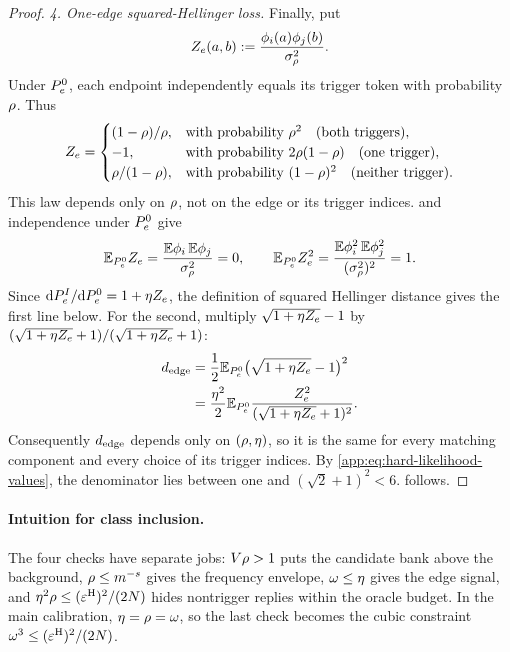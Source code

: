 \begin{proof}
\emph{4. One-edge squared-Hellinger loss.}
Finally, put
\[
 Z_e(a,b):=
 \frac{\phi_{i}(a)\phi_{j}(b)}
      {\sigma_\rho^2}.
\]
Under \(P_{e}^{0}\), each endpoint independently equals
its trigger token with probability \(\rho\).  Thus
\[
 Z_e=
 \begin{cases}
 (1-\rho)/\rho,
   &\text{with probability }\rho^2
      \quad\text{(both triggers)},\\
 -1,
   &\text{with probability }2\rho(1-\rho)
      \quad\text{(one trigger)},\\
 \rho/(1-\rho),
   &\text{with probability }(1-\rho)^2
      \quad\text{(neither trigger)}.
 \end{cases}
 \]
This law depends only on \(\rho\), not on the edge or its trigger
indices.
 and independence under
\(P_{e}^{0}\) give
\[
 \mathbb E_{P_{e}^{0}}Z_e
 =\frac{\mathbb E\phi_{i}\,
        \mathbb E\phi_{j}}{\sigma_\rho^2}=0,\qquad
 \mathbb E_{P_{e}^{0}}Z_e^2
 =\frac{\mathbb E\phi_{i}^2\,
        \mathbb E\phi_{j}^2}{(\sigma_\rho^2)^2}=1.
\]  Since
\(\mathrm dP_{e}^{I}/\mathrm dP_{e}^{0}
=1+\eta Z_e\),
the definition of squared Hellinger distance gives the first line below.
For the second, multiply
$\sqrt{1+\eta Z_e}-1$ by
$(\sqrt{1+\eta Z_e}+1)/
 (\sqrt{1+\eta Z_e}+1)$:
\begin{align}
 d_{\mathrm{edge}}
 &=\frac12\mathbb E_{P_{e}^{0}}
       \bigl(\sqrt{1+\eta Z_e}-1\bigr)^2\notag\\
 &=\frac{\eta^2}{2}
  \mathbb E_{P_{e}^{0}}
  \frac{Z_e^2}
       {(\sqrt{1+\eta Z_e}+1)^2}.
 \label{app:eq:hard-edge-distance-formula}
\end{align}
Consequently \(d_{\mathrm{edge}}\) depends only on
\((\rho,\eta)\), so it is the same for every matching
component and every choice of its trigger indices.
By \eqref{app:eq:hard-likelihood-values}, the denominator lies between
one and \((\sqrt2+1)^2<6\).
 follows.
\end{proof}

\paragraph{Intuition for class inclusion.}
The four checks have separate jobs:
$V\rho>1$ puts the candidate bank above the background,
$\rho\le m^{-s}$ gives the frequency
envelope, $\omega\le\eta$ gives the edge signal, and
$\eta^2\rho\le(\varepsilon^{\mathrm H})^2/(2N)$ hides nontrigger replies
within the oracle budget.  In the main calibration,
$\eta=\rho=\omega$, so the last check becomes the
cubic constraint $\omega^3\le(\varepsilon^{\mathrm H})^2/(2N)$.

